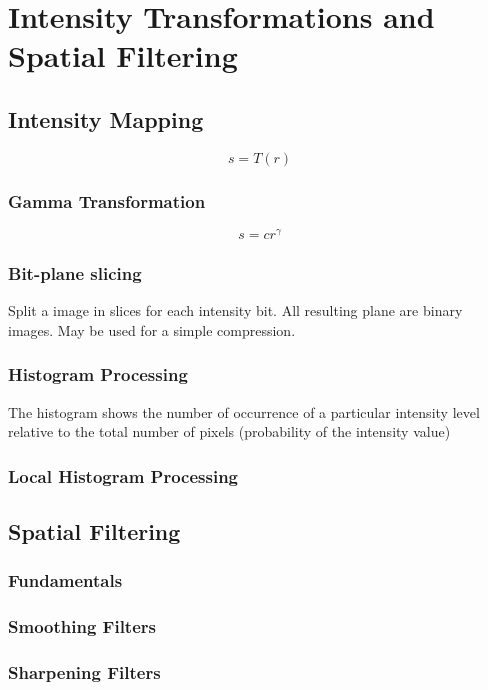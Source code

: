 \section{Intensity Transformations and Spatial Filtering }

\subsection{Intensity Mapping}
\begin{equation}
s = T(r)
\end{equation}

\subsubsection{Gamma Transformation}
\begin{equation}
s = c r^\gamma
\end{equation}

\subsubsection{Bit-plane slicing}
Split a image in slices for each intensity bit.  All resulting plane are binary images.
May be used for a simple compression.

\subsubsection{Histogram Processing}
The histogram shows the number of occurrence of a particular intensity level relative to the total number of pixels (probability of the intensity value)

\subsubsection{Local Histogram Processing}

\subsection{Spatial Filtering}
\subsubsection{Fundamentals}

\subsubsection{Smoothing Filters}
\subsubsection{Sharpening Filters}
